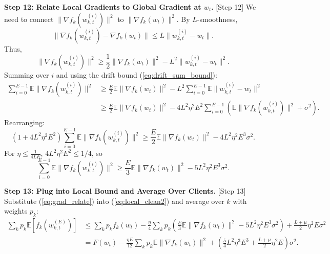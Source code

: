 \documentclass{article}
\begin{document}
\textbf{Step 12: Relate Local Gradients to Global Gradient at $w_t$.} [Step 12] %
We need to connect $\| \nabla f_k(w_{k,t}^{(i)}) \|^2$ to $\| \nabla f_k(w_t) \|^2$. By $L$-smoothness,
\begin{equation}
    \| \nabla f_k(w_{k,t}^{(i)}) - \nabla f_k(w_t) \| \leq L \| w_{k,t}^{(i)} - w_t \|.
\end{equation}
Thus,
\begin{equation}
    \| \nabla f_k(w_{k,t}^{(i)}) \|^2 \geq \frac{1}{2} \| \nabla f_k(w_t) \|^2 - L^2 \| w_{k,t}^{(i)} - w_t \|^2.
\end{equation}
Summing over $i$ and using the drift bound (\ref{eq:drift_sum_bound}):
\begin{align}
    \sum_{i=0}^{E-1} \mathbb{E} \| \nabla f_k(w_{k,t}^{(i)}) \|^2 &\geq \frac{E}{2} \mathbb{E} \| \nabla f_k(w_t) \|^2 - L^2 \sum_{i=0}^{E-1} \mathbb{E} \| w_{k,t}^{(i)} - w_t \|^2 \\
    &\geq \frac{E}{2} \mathbb{E} \| \nabla f_k(w_t) \|^2 - 4 L^2 \eta^2 E^2 \sum_{i=0}^{E-1} \left( \mathbb{E} \| \nabla f_k(w_{k,t}^{(i)}) \|^2 + \sigma^2 \right).
\end{align}
Rearranging:
\begin{equation}
    \left(1 + 4 L^2 \eta^2 E^2\right) \sum_{i=0}^{E-1} \mathbb{E} \| \nabla f_k(w_{k,t}^{(i)}) \|^2 \geq \frac{E}{2} \mathbb{E} \| \nabla f_k(w_t) \|^2 - 4 L^2 \eta^2 E^3 \sigma^2.
\end{equation}
For $\eta \leq \frac{1}{4 L E}$, $4 L^2 \eta^2 E^2 \leq 1/4$, so
\begin{equation}
    \sum_{i=0}^{E-1} \mathbb{E} \| \nabla f_k(w_{k,t}^{(i)}) \|^2 \geq \frac{E}{3} \mathbb{E} \| \nabla f_k(w_t) \|^2 - 5 L^2 \eta^2 E^3 \sigma^2. \label{eq:grad_relate}
\end{equation}

\textbf{Step 13: Plug into Local Bound and Average Over Clients.} [Step 13]
Substitute (\ref{eq:grad_relate}) into (\ref{eq:local_clean2}) and average over $k$ with weights $p_k$:
\begin{align}
    \sum_k p_k \mathbb{E}[f_k(w_{k,t}^{(E)})] &\leq \sum_k p_k f_k(w_t) - \frac{\eta}{4} \sum_k p_k \left( \frac{E}{3} \mathbb{E} \| \nabla f_k(w_t) \|^2 - 5 L^2 \eta^2 E^3 \sigma^2 \right) + \frac{L+\mu}{2} \eta^2 E \sigma^2 \\
    &= F(w_t) - \frac{\eta E}{12} \sum_k p_k \mathbb{E} \| \nabla f_k(w_t) \|^2 + \left( \frac{5}{4} L^2 \eta^3 E^3 + \frac{L+\mu}{2} \eta^2 E \right) \sigma^2. \label{eq:avg_local}
\end{align}
\end{document}
